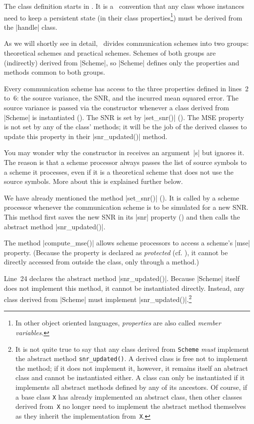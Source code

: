 The class definition starts in . It is a \matlab\ convention that any
class whose instances need to keep a persistent state (in their class
properties\footnote{In other object oriented languages, \emph{properties}
are also called \emph{member variables.}}) must be derived from the |handle|
class. 

As we will shortly see in detail, \jscsim\ divides communication schemes into
two groups: theoretical schemes and practical schemes. Schemes of both
groups are (indirectly) derived from |Scheme|, so |Scheme| defines only the
properties and methods common to both groups.

Every communication scheme has access to the three properties defined in
lines~2 to~6: the source variance, the SNR, and the incurred mean squared error.
The source variance is passed via the constructor whenever a class derived from
|Scheme| is instantiated (). The SNR is set by |set_snr()|
(). The MSE property is not set by any of the class' methods; it
will be the job of the derived classes to update this property in their
|snr_updated()| method. 

You may wonder why the constructor in  receives an argument~|s| but
ignores it. The reason is that a scheme processor always passes the list of
source symbols to a scheme it processes, even if it is a theoretical scheme that
does not use the source symbols. More about this is explained further below.

We have already mentioned the method |set_snr()| (). It is called by
a scheme processor whenever the communication scheme is to be simulated for a
new SNR. This method first saves the new SNR in its |snr| property
() and then calls the abstract method |snr_updated()|. 

The method |compute_mse()| allows scheme processors to access a scheme's
|mse| property. (Because the property is declared as \emph{protected} (cf.
), it cannot be directly accessed from outside the class, only
through a method.) 

Line~24 declares the abstract method |snr_updated()|. Because |Scheme| itself
does not implement this method, it cannot be instantiated directly. Instead, any
class derived from |Scheme| must implement |snr_updated()|.\footnote{It is not
quite true to say that any class derived from \texttt{Scheme} \emph{must}
implement the abstract method \texttt{snr\_updated()}. A derived class is free
not to implement the method; if it does not implement it, however, it remains
itself an abstract class and cannot be instantiated either. A class can only be
instantiated if it implements all abstract methods defined by any of its
ancestors. Of course, if a base class \texttt{X} has already implemented an
abstract class, then other classes derived from~\texttt{X} no longer need to
implement the abstract method themselves as they inherit the implementation
from~\texttt{X}.}



